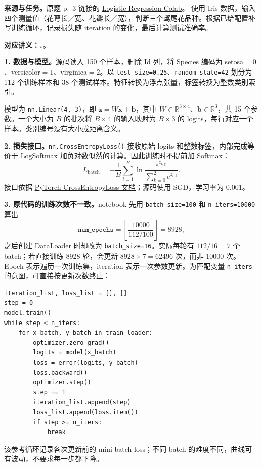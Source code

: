 \nopagebreak[4]

\textbf{来源与任务。}原题 p.~3 链接的
\href{https://colab.research.google.com/drive/1C63UPtGeC21-N-TaZftFdWxwMKMLz_Md?usp=sharing}{Logistic Regression Colab}。
使用 Iris 数据，输入四个测量值（花萼长／宽、花瓣长／宽），判断三个鸢尾花品种。根据已给配置补写训练循环，记录损失随 iteration 的变化，最后计算测试准确率。

\textbf{对应讲义：}、。

\begin{checkedsolution}
\textbf{1. 数据与模型。}源码读入 150 个样本，删除 Id 列，将 Species 编码为 setosa$=0$、versicolor$=1$、virginica$=2$。以 \texttt{test\_size=0.25}、\texttt{random\_state=42} 划分为 112 个训练样本和 38 个测试样本。特征转换为浮点张量，标签转换为整数类别索引。

模型为 \texttt{nn.Linear(4, 3)}，即 $\mathbf z=W\mathbf x+\mathbf b$，其中 $W\in\mathbb R^{3\times4}$、$\mathbf b\in\mathbb R^3$，共 15 个参数。一个大小为 $B$ 的批次将 $B\times4$ 的输入映射为 $B\times3$ 的 logits，每行对应一个样本。类别编号没有大小或距离含义。

\textbf{2. 损失接口。}\texttt{nn.CrossEntropyLoss()} 接收原始 logits 和整数标签，内部完成等价于 LogSoftmax 加负对数似然的计算。因此训练时不提前加 Softmax：
\[
 L_{\mathrm{batch}}=-\frac1B\sum_{i=1}^{B}
 \ln\frac{e^{z_{i,y_i}}}{\sum_{k=0}^{2}e^{z_{i,k}}}.
\]
接口依据 \href{https://docs.pytorch.org/docs/stable/generated/torch.nn.CrossEntropyLoss.html}{PyTorch CrossEntropyLoss 文档}；源码使用 SGD，学习率为 $0.001$。

\textbf{3. 原代码的训练次数不一致。}notebook 先用 \texttt{batch\_size=100} 和 \texttt{n\_iters=10000} 算出
\[
 \texttt{num\_epochs}=\left\lfloor\frac{10000}{112/100}\right\rfloor=8928,
\]
之后创建 DataLoader 时却改为 \texttt{batch\_size=16}。实际每轮有 $112/16=7$ 个 batch；若直接训练 8928 轮，会更新 $8928\times7=62496$ 次，而非 10000 次。Epoch 表示遍历一次训练集，iteration 表示一次参数更新。为匹配变量 \texttt{n\_iters} 的意图，可直接按更新次数终止：
\begingroup\small\linespread{1.05}\selectfont
\begin{verbatim}
iteration_list, loss_list = [], []
step = 0
model.train()
while step < n_iters:
    for x_batch, y_batch in train_loader:
        optimizer.zero_grad()
        logits = model(x_batch)
        loss = error(logits, y_batch)
        loss.backward()
        optimizer.step()
        step += 1
        iteration_list.append(step)
        loss_list.append(loss.item())
        if step >= n_iters:
            break
\end{verbatim}
\endgroup
该参考循环记录各次更新前的 mini-batch loss；不同 batch 的难度不同，曲线可有波动，不要求每一步都下降。


\end{checkedsolution}

